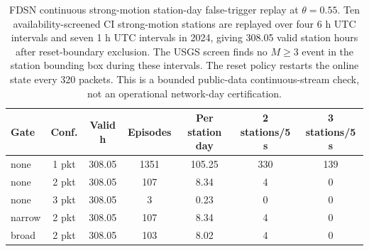\begin{table}[!t]
\centering
\caption{FDSN continuous strong-motion station-day false-trigger replay at $\theta=0.55$. Ten availability-screened CI strong-motion stations are replayed over four 6 h UTC intervals and seven 1 h UTC intervals in 2024, giving 308.05 valid station hours after reset-boundary exclusion. The USGS screen finds no $M\geq3$ event in the station bounding box during these intervals. The reset policy restarts the online state every 320 packets. This is a bounded public-data continuous-stream check, not an operational network-day certification.}
\label{tab:fdsn_continuous_false_alarm}
{\footnotesize\setlength{\tabcolsep}{1.5pt}\renewcommand{\arraystretch}{1.06}
\begin{tabular}{@{}lcccccc@{}}
\toprule
Gate & Conf. & Valid h & Episodes & Per station day & 2 stations/5 s & 3 stations/5 s\\
\midrule
none & 1 pkt & 308.05 & 1351 & 105.25 & 330 & 139\\
none & 2 pkt & 308.05 & 107 & 8.34 & 4 & 0\\
none & 3 pkt & 308.05 & 3 & 0.23 & 0 & 0\\
narrow & 2 pkt & 308.05 & 107 & 8.34 & 4 & 0\\
broad & 2 pkt & 308.05 & 103 & 8.02 & 4 & 0\\
\bottomrule
\end{tabular}}
\end{table}

